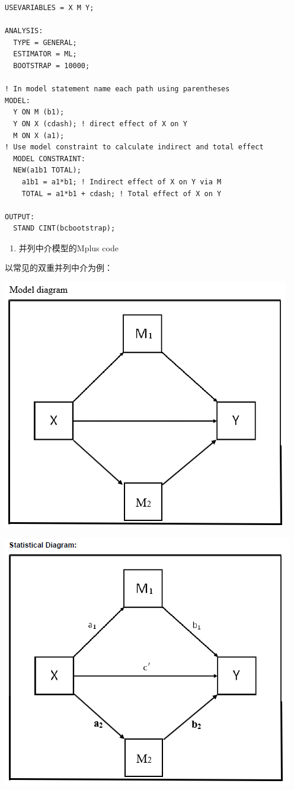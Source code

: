 \documentclass[
]{book}
\providecommand{\tightlist}{%
  \setlength{\itemsep}{0pt}\setlength{\parskip}{0pt}}
\begin{document}
\begin{verbatim}
USEVARIABLES = X M Y;

ANALYSIS:
  TYPE = GENERAL;
  ESTIMATOR = ML;
  BOOTSTRAP = 10000;

! In model statement name each path using parentheses
MODEL:
  Y ON M (b1);
  Y ON X (cdash); ! direct effect of X on Y
  M ON X (a1);
! Use model constraint to calculate indirect and total effect
  MODEL CONSTRAINT:
  NEW(a1b1 TOTAL);
    a1b1 = a1*b1; ! Indirect effect of X on Y via M
    TOTAL = a1*b1 + cdash; ! Total effect of X on Y

OUTPUT:
  STAND CINT(bcbootstrap);
\end{verbatim}

\begin{enumerate}
\def\labelenumi{\arabic{enumi}.}
\setcounter{enumi}{1}
\tightlist
\item
  并列中介模型的Mplus code
\end{enumerate}

以常见的双重并列中介为例：

\includegraphics{figs/1133.png}

\includegraphics{figs/1134.png}
\end{document}
